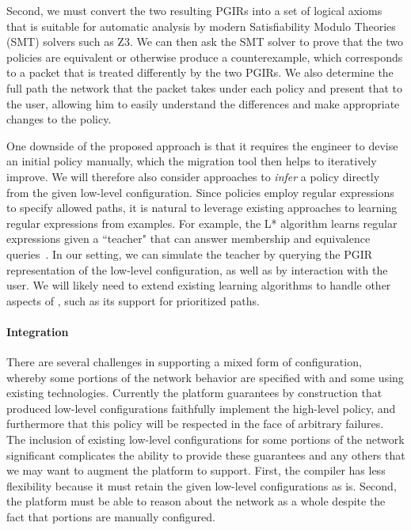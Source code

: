 Second, we must convert the two resulting PGIRs into a set of logical axioms that is suitable for automatic analysis by modern Satisfiability Modulo Theories (SMT) solvers such as Z3.  We can then ask the SMT solver to prove that the two policies are equivalent or otherwise produce a counterexample, which corresponds to a packet that is treated differently by the two PGIRs.  We also determine the full path the network that the packet takes under each policy and present that to the user, allowing him to easily understand the differences and make appropriate changes to the \Propane policy.

One downside of the proposed approach is that it requires the engineer to devise an initial \Propane policy manually, which the migration tool then helps to iteratively improve.  We will therefore also consider approaches to {\em infer} a \Propane policy directly from the given low-level configuration.  Since \Propane policies employ regular expressions to specify allowed paths, it is natural to leverage existing approaches to learning regular expressions from examples.  For example, the L* algorithm learns regular expressions given a ``teacher" that can answer membership and equivalence queries~\cite{}.  In our setting, we can simulate the teacher by querying the PGIR representation of the low-level configuration, as well as by interaction with the user.  We will likely need to extend existing learning algorithms to handle other aspects of \Propane, such as its support for prioritized paths.

\paragraph{Integration} There are several challenges in supporting a mixed form of configuration, whereby some portions of the network behavior are specified with \Propane and some using existing technologies.  Currently the \Propane platform guarantees by construction that produced low-level configurations faithfully implement the high-level policy, and furthermore that this policy will be respected in the face of arbitrary failures.  The inclusion of existing low-level configurations for some portions of the network significant complicates the ability to provide these guarantees and any others that we may want to augment the platform to support. First, the \Propane compiler has less flexibility because it must retain the given low-level configurations as is.  Second, the \Propane platform must be able to reason about the network as a whole despite the fact that portions are manually configured.

